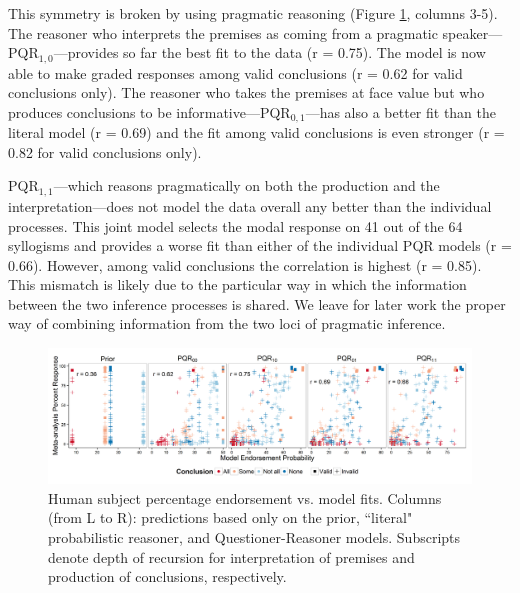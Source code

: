 \documentclass[10pt,letterpaper]{article}
\begin{document}
This symmetry is broken by using pragmatic reasoning (Figure \ref{fig:megaScatter}, columns 3-5). The reasoner who interprets the premises as coming from a pragmatic speaker---PQR$_{1,0}$---provides so far the best fit to the data (r = 0.75). The model is now able to make graded responses among valid conclusions (r = 0.62 for valid conclusions only). The reasoner who takes the premises at face value but who produces conclusions to be informative---PQR$_{0,1}$---has also a better fit than the literal model (r = 0.69) and the fit among valid conclusions is even stronger (r = 0.82 for valid conclusions only). 

PQR$_{1,1}$---which reasons pragmatically on both the production and the interpretation---does not model the data overall any better than the individual processes. This joint model selects the modal response on 41 out of the 64 syllogisms and provides a worse fit than either of the individual PQR models (r = 0.66). However, among valid conclusions the correlation is highest (r = 0.85). This mismatch is likely due to the particular way in which the information between the two inference processes is shared.  We leave for later work the proper way of combining information from the two loci of pragmatic inference.



\begin{figure}[t!] %
\centering
	\subfigure
		\centering
  \includegraphics[width=\textwidth]{fig2_multiScatter_n6_br25_alpha2}
  \caption{Human subject percentage endorsement vs. model fits.
  Columns (from L to R): predictions based only on the prior, ``literal" probabilistic reasoner, and Questioner-Reasoner models. Subscripts denote depth of recursion for interpretation of premises and production of conclusions, respectively.}
  \label{fig:megaScatter}

\end{figure}
\end{document}
